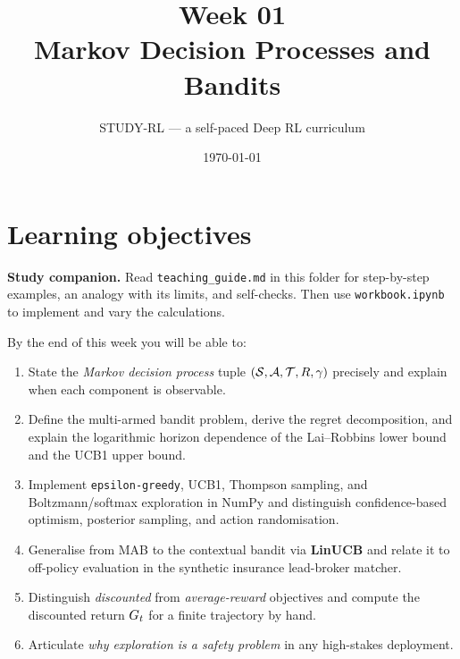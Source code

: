 \documentclass[11pt,oneside]{scrbook}
\title{{\color{rlblue}\textbf{Week 01} \\ \Huge Markov Decision Processes and Bandits}}
\author{STUDY-RL --- a self-paced Deep RL curriculum}
\date{\today}
\begin{document}
\maketitle
\tableofcontents
\newpage

\chapter*{Learning objectives}


\noindent\textbf{Study companion.} Read \texttt{teaching\_guide.md} in this
folder for step-by-step examples, an analogy with its limits, and self-checks.
Then use \texttt{workbook.ipynb} to implement and vary the calculations.
\par\medskip

\begin{keyidea}
By the end of this week you will be able to:
\begin{enumerate}\setlength\itemsep{2pt}
  \item State the \emph{Markov decision process} tuple $(\mathcal{S},\mathcal{A},\mathcal{T},R,\gamma)$
        precisely and explain when each component is observable.
  \item Define the multi-armed bandit problem, derive the regret decomposition, and explain the logarithmic horizon
        dependence of the Lai--Robbins lower bound and the UCB1 upper bound.
  \item Implement \texttt{epsilon-greedy}, UCB1, Thompson sampling, and
        Boltzmann/softmax exploration in NumPy and distinguish confidence-based
        optimism, posterior sampling, and action randomisation.
  \item Generalise from MAB to the contextual bandit via \textbf{LinUCB} and
        relate it to off-policy evaluation in the synthetic insurance lead-broker matcher.
  \item Distinguish \emph{discounted} from \emph{average-reward} objectives and
        compute the discounted return $G_t$ for a finite trajectory by hand.
  \item Articulate \emph{why exploration is a safety problem} in any
        high-stakes deployment.
\end{enumerate}
\end{keyidea}

\end{document}
